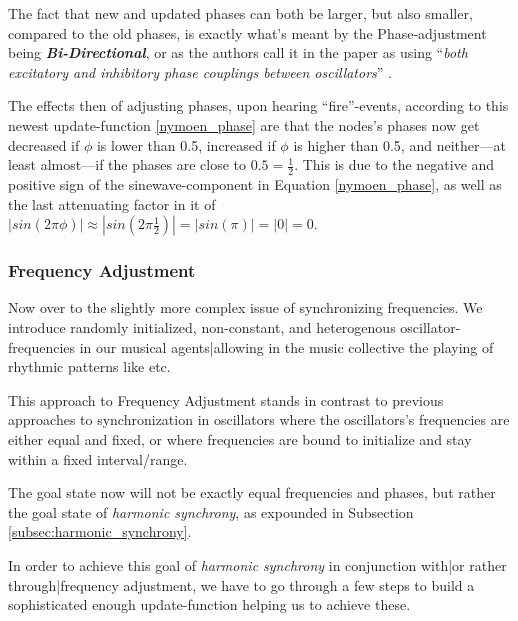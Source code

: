 			The fact that new and updated phases can both be larger, but also smaller, compared to the old phases, is exactly what's meant by the Phase-adjustment being \textbf{\textit{Bi-Directional}}, or as the authors call it in the paper as using ``\textit{both excitatory and inhibitory phase couplings between oscillators}'' \cite{nymoen_synch}.
			
			The effects then of adjusting phases, upon hearing ``fire''-events, according to this newest update-function \eqref{nymoen_phase} are that the nodes's phases now get decreased if $\phi$ is lower than 0.5, increased if $\phi$ is higher than 0.5, and neither—at least almost—if the phases are close to $0.5 = \frac{1}{2}$. This is due to the negative and positive sign of the sinewave-component in Equation \eqref{nymoen_phase}, as well as the last attenuating factor in it of $| sin(2\pi\phi) | \approx | sin(2\pi \frac{1}{2}) | = | sin(\pi) | = | 0 | = 0.$
		
		
		\subsubsection{Frequency Adjustment}
		\label{subsubsec:freq_adj}
			
			Now over to the slightly more complex issue of synchronizing frequencies. We introduce randomly initialized, non-constant, and heterogenous oscillator-frequencies in our musical agents|allowing in the music collective the playing of rhythmic patterns like  etc.
			
			This approach to Frequency Adjustment stands in contrast to previous approaches to synchronization in oscillators  where the oscillators's frequencies are either equal and fixed, or where frequencies are bound to initialize and stay within a fixed interval/range.
			
			The goal state now will not be exactly equal frequencies and phases, but rather the goal state of \textit{harmonic synchrony}, as expounded in Subsection \ref{subsec:harmonic_synchrony}.
			
			In order to achieve this goal of \textit{harmonic synchrony} in conjunction with|or rather through|frequency adjustment, we have to go through a few steps to build a sophisticated enough update-function helping us to achieve these.
			
